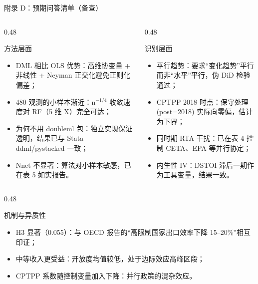 \documentclass[aspectratio=169,10pt]{ctexbeamer}
\begin{document}
\begin{frame}{附录 D：预期问答清单（备查）}
  \footnotesize
  \begin{columns}[T,totalwidth=\textwidth]
    \begin{column}{0.48\textwidth}
      \begin{block}{方法层面}
        \begin{itemize}\scriptsize
          \item DML 相比 OLS 优势：高维协变量 + 非线性 + Neyman 正交化避免正则化偏差；
          \item 480 观测的小样本渐近：n$^{-1/4}$ 收敛速度对 RF（5 维 X）完全可达；
          \item 为何不用 doubleml 包：独立实现保证透明，结果已与 Stata ddml/pystacked 一致；
          \item Nnet 不显著：算法对小样本敏感，已在表 5 如实报告。
        \end{itemize}
      \end{block}
    \end{column}
    \begin{column}{0.48\textwidth}
      \begin{block}{识别层面}
        \begin{itemize}\scriptsize
          \item 平行趋势：要求“变化趋势”平行而非“水平”平行，伪 DiD 检验通过；
          \item CPTPP 2018 时点：保守处理 (post=2018) 实际向零偏，估计为下界；
          \item 同时期 RTA 干扰：已在表 4 控制 CETA、EPA 等并行协定；
          \item 内生性 IV：DSTOI 滞后一期作为工具变量，结果一致。
        \end{itemize}
      \end{block}
    \end{column}
  \end{columns}
  \vspace{0.3em}
  \begin{columns}[T,totalwidth=\textwidth]
    \begin{column}{0.48\textwidth}
      \begin{block}{机制与异质性}
        \begin{itemize}\scriptsize
          \item H3 显著（0.055）：与 OECD 报告的“高限制国家出口效率下降 15--20\%”相互印证；
          \item 中等收入更受益：开放度均值较低，处于边际效应高峰区段；
          \item CPTPP 系数随控制变量加入下降：并行政策的混杂效应。

\end{itemize}
\end{block}
\end{column}
\end{columns}
\end{frame}
\end{document}
